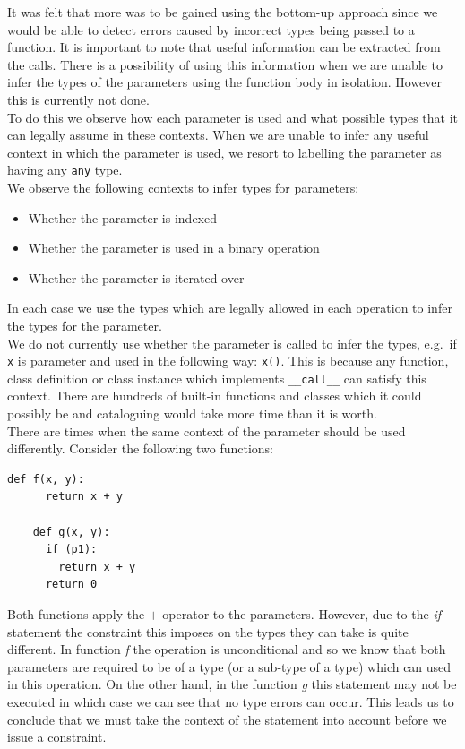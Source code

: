 \documentclass[12pt, titlepage]{article}
\begin{document}
It was felt that more was to be gained using the bottom-up approach since we would be able to detect errors caused by incorrect types being passed to a function. It is important to note that useful information can be extracted from the calls. There is a possibility of using this information when we are unable to infer the types of the parameters using the function body in isolation. However this is currently not done. \\
\indent To do this we observe how each parameter is used and what possible types that it can legally assume in these contexts. When we are unable to infer any useful context in which the parameter is used, we resort to labelling the parameter as having any \texttt{any} type. \\
\indent We observe the following contexts to infer types for parameters:
\begin{itemize}
	\item Whether the parameter is indexed
	\item Whether the parameter is used in a binary operation
	\item Whether the parameter is iterated over
\end{itemize}
In each case we use the types which are legally allowed in each operation to infer the types for the parameter. \\
\indent We do not currently use whether the parameter is called to infer the types, e.g.\ if \texttt{x} is parameter and used in the following way: \texttt{x()}. This is because any function, class definition or class instance which implements \texttt{\_\_call\_\_} can satisfy this context. There are hundreds of built-in functions and classes which it could possibly be and cataloguing would take more time than it is worth. \\
\indent There are times when the same context of the parameter should be used differently. Consider the following two functions:
\begin{lstlisting}[mathescape]
	def f(x, y):
	  return x + y
		
	def g(x, y):
	  if (p1):
	    return x + y
	  return 0
\end{lstlisting}
Both functions apply the $+$ operator to the parameters. However, due to the \textit{if} statement the constraint this imposes on the types they can take is quite different. In function \textit{f} the operation is unconditional and so we know that both parameters are required to be of a type (or a sub-type of a type) which can used in this operation. On the other hand, in the function \textit{g} this statement may not be executed in which case we can see that no type errors can occur. This leads us to conclude that we must take the context of the statement into account before we issue a constraint.
\end{document}
